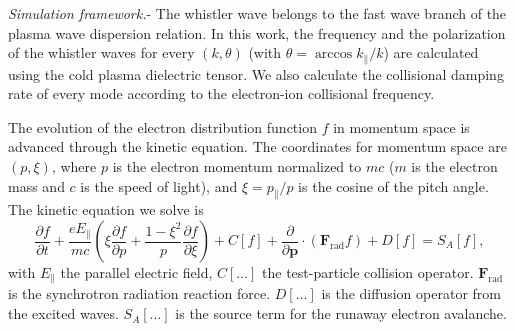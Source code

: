 \documentclass[aps, prl, preprint,english,superscriptaddress]{revtex4-1}
\begin{document}
\textit{Simulation framework.}-
The whistler wave belongs to the fast wave branch of the plasma wave dispersion relation.
In this work, the frequency and the polarization of the whistler waves for every $(k,\theta)$ (with $\theta=\arccos k_{\parallel}/k$) are calculated using the cold plasma dielectric tensor. We also calculate the collisional damping rate of every mode according to the electron-ion collisional frequency\cite{aleynikov_stability_2015}.

The evolution of the electron distribution function $f$ in momentum space is advanced through the kinetic equation. The coordinates for momentum space are $(p,\xi)$, where $p$ is the electron momentum normalized to $mc$ ($m$ is the electron mass and $c$ is the speed of light), and $\xi=p_{\parallel}/p$ is the cosine of the pitch angle. The kinetic equation we solve is
\begin{equation}
\frac{\partial f}{\partial t}+\frac{eE_{\parallel}}{mc}\left(\xi \frac{\partial f}{\partial p}+\frac{1-\xi^2}{p}\frac{\partial f}{\partial \xi}\right)+C\left[f\right]+\frac{\partial}{\partial \mathbf{p}}\cdot\left(\mathbf{F}_{\mathrm{rad}}f\right)+D\left[f\right]=S_{A}\left[f\right],
\end{equation}
with $E_{\parallel}$ the parallel electric field, 
$C[\dots]$ the test-particle collision operator\cite{landreman_numerical_2014}. $\mathbf{F}_{\mathrm{rad}}$ is the synchrotron radiation reaction force\cite{stahl_effective_2015}. $D\left[\dots\right]$ is the diffusion operator from the excited waves. $S_{A}\left[\dots\right]$ is the source term for the runaway electron avalanche\cite{liu_adjoint_2017}. 
\end{document}
